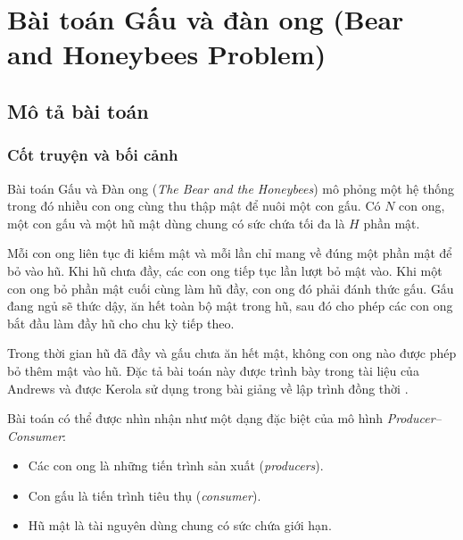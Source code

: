 %

\newpage
\section{Bài toán Gấu và đàn ong (Bear and Honeybees Problem)}

\subsection{Mô tả bài toán}

\subsubsection*{Cốt truyện và bối cảnh}

Bài toán Gấu và Đàn ong (\textit{The Bear and the Honeybees}) mô phỏng
một hệ thống trong đó nhiều con ong cùng thu thập mật để nuôi một con
gấu. Có $N$ con ong, một con gấu và một hũ mật dùng chung có sức chứa
tối đa là $H$ phần mật.

Mỗi con ong liên tục đi kiếm mật và mỗi lần chỉ mang về đúng một phần
mật để bỏ vào hũ. Khi hũ chưa đầy, các con ong tiếp tục lần lượt bỏ mật
vào. Khi một con ong bỏ phần mật cuối cùng làm hũ đầy, con ong đó phải
đánh thức gấu. Gấu đang ngủ sẽ thức dậy, ăn hết toàn bộ mật trong hũ,
sau đó cho phép các con ong bắt đầu làm đầy hũ cho chu kỳ tiếp theo.

Trong thời gian hũ đã đầy và gấu chưa ăn hết mật, không con ong nào được
phép bỏ thêm mật vào hũ. Đặc tả bài toán này được trình bày trong tài
liệu của Andrews và được Kerola sử dụng trong bài giảng về lập trình
đồng thời
\cite[Problem~4.36]{andrews2000}\cite[Slides~2--6]{kerola2012}.

Bài toán có thể được nhìn nhận như một dạng đặc biệt của mô hình
\textit{Producer--Consumer}:

\begin{itemize}
\item Các con ong là những tiến trình sản xuất (\textit{producers}).
\item Con gấu là tiến trình tiêu thụ (\textit{consumer}).
\item Hũ mật là tài nguyên dùng chung có sức chứa giới hạn.
\end{itemize}

